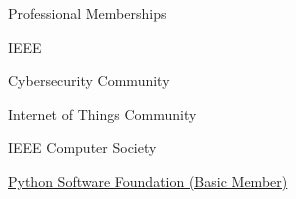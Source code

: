 
\begin{rBulletSection}[2]{Professional Memberships}

    \item IEEE

    \begin{rBulletList}

      \item Cybersecurity Community

      \item Internet of Things Community

    \end{rBulletList}

    \item IEEE Computer Society

    \item \href{https://www.python.org/users/mmabey/}{Python Software Foundation (Basic Member)}

\end{rBulletSection}
